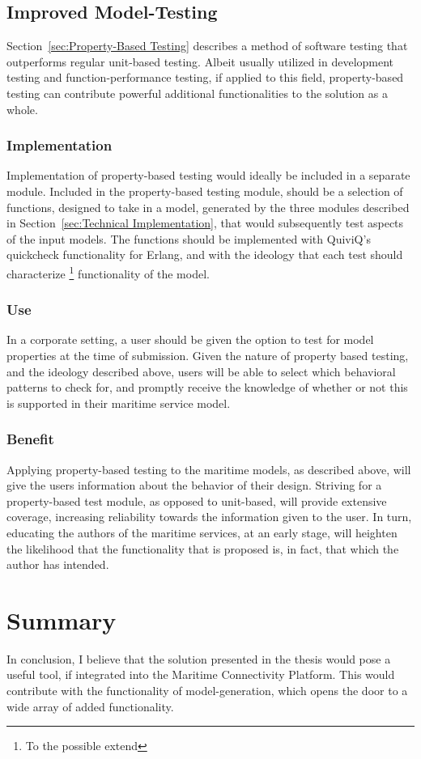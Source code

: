 \subsection{Improved Model-Testing}
Section~\ref{sec:Property-Based Testing} describes a method of software testing that outperforms regular unit-based testing. Albeit usually utilized in development testing and function-performance testing, if applied to this field, property-based testing can contribute powerful additional functionalities to the solution as a whole. 
\subsubsection{Implementation}
Implementation of property-based testing would ideally be included in a separate module. Included in the property-based testing module, should be a selection of functions, designed to take in a model, generated by the three modules described in Section~\ref{sec:Technical Implementation}, that would subsequently test aspects of the input models. The functions should be implemented with QuiviQ's quickcheck functionality for Erlang, and with the ideology that each test should characterize \footnote{To the possible extend} functionality of the model.
\subsubsection{Use}
In a corporate setting, a user should be given the option to test for model properties at the time of submission. Given the nature of property based testing, and the ideology described above, users will be able to select which behavioral patterns to check for, and promptly receive the knowledge of whether or not this is supported in their maritime service model.
\subsubsection{Benefit}
Applying property-based testing to the maritime models, as described above, will give the users information about the behavior of their design. Striving for a property-based test module, as opposed to unit-based, will provide extensive coverage, increasing reliability towards the information given to the user. In turn, educating the authors of the maritime services, at an early stage, will heighten the likelihood that the functionality that is proposed is, in fact, that which the author has intended.
\section{Summary}
In conclusion, I believe that the solution presented in the thesis would pose a useful tool, if integrated into the Maritime Connectivity Platform. This would contribute with the functionality of model-generation, which opens the door to a wide array of added functionality. 


